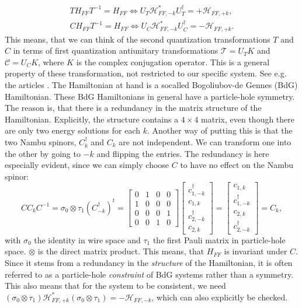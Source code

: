 \begin{align}
TH_{FF}T^{-1} = H_{FF} \Leftrightarrow U_T\mathcal{H}^*_{FF,-k} U^\dagger_T = + \mathcal{H}_{FF,+k}, \nonumber \\
CH_{FF}T^{-1} = H_{FF} \Leftrightarrow U_C\mathcal{H}^*_{FF,-k} U^\dagger_C = - \mathcal{H}_{FF,+k}. 
\label{eq.Symmetryrequirements}
\end{align}
This means, that we can think of the second quantization transformations $T$ and $C$ in terms of first quantization antiunitary transformations $\mathcal{T} = U_TK$ and $\mathcal{C} = U_CK$, where $K$ is the complex conjugation operator. This is a general property of these transformation, not restricted to our specific system. See e.g. the articles \cite{Ludwig.Topology, Chiu.Topology}. The Hamiltonian at hand is a socalled Bogoliubov-de Gennes (BdG) Hamiltonian. These BdG Hamiltonians in general have a particle-hole symmetry. The reason is, that there is a redundancy in the matrix structure of the Hamiltonian. Explicitly, the structure contains a $4\times 4$ matrix, even though there are only two energy solutions for each $k$. Another way of putting this is that the two Nambu spinors, $C^\dagger_k$ and $C_k$ are not independent. We can transform one into the other by going to $-k$ and flipping the entries. The redundancy is here especially evident, since we can simply choose $C$ to have no effect on the Nambu spinor:
\begin{equation}
C C_k C^{-1} =  \sigma_0\otimes \tau_1 (C^\dagger_{-k})^t = \begin{bmatrix} 0 & 1 & 0 & 0 \\ 1 & 0 & 0 & 0 \\ 0 & 0 & 0 & 1 \\ 0 & 0 & 1 & 0 \end{bmatrix} \begin{bmatrix} c^\dagger_{1,-k} \\ c_{1,k} \\ c^\dagger_{2,-k} \\ c_{2,k} \end{bmatrix} = \begin{bmatrix} c_{1,k} \\ c^\dagger_{1,-k} \\ c_{2,k} \\ c^\dagger_{2,-k} \end{bmatrix} = C_k,
\end{equation}
with $\sigma_0$ the identity in wire space and $\tau_1$ the first Pauli matrix in particle-hole space. $\otimes$ is the direct matrix product. This means, that $H_{FF}$ is invariant under $C$. Since it stems from a redundancy in the \textit{structure} of the Hamiltonian, it is often referred to as a particle-hole \textit{constraint} of BdG systems rather than a symmetry. This also means that for the system to be consistent, we need $(\sigma_0\otimes\tau_1)\mathcal{H}^*_{FF,+k}(\sigma_0\otimes\tau_1) = - \mathcal{H}_{FF,-k}$, which can also explicitly be checked. 

